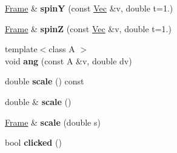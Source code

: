 \begin{DoxyCompactItemize}
\item 
\hypertarget{classvsr_1_1_frame_af899032928e02d32a79583195922c9c9}{\hyperlink{classvsr_1_1_frame}{Frame} \& {\bfseries spin\-Y} (const \hyperlink{namespacevsr_a0d061c30ac198a710a1b92dd8b343273}{Vec} \&v, double t=1.)}\label{classvsr_1_1_frame_af899032928e02d32a79583195922c9c9}

\item 
\hypertarget{classvsr_1_1_frame_a612a28303fe567b4dce7240eeace334b}{\hyperlink{classvsr_1_1_frame}{Frame} \& {\bfseries spin\-Z} (const \hyperlink{namespacevsr_a0d061c30ac198a710a1b92dd8b343273}{Vec} \&v, double t=1.)}\label{classvsr_1_1_frame_a612a28303fe567b4dce7240eeace334b}

\item 
\hypertarget{classvsr_1_1_frame_ac196bc3d06fc0fae2d169e4bf230665a}{{\footnotesize template$<$class A $>$ }\\void {\bfseries ang} (const A \&v, double dv)}\label{classvsr_1_1_frame_ac196bc3d06fc0fae2d169e4bf230665a}

\item 
\hypertarget{classvsr_1_1_frame_aed6f9a0b9155e846e30e09bc4bc63264}{double {\bfseries scale} () const }\label{classvsr_1_1_frame_aed6f9a0b9155e846e30e09bc4bc63264}

\item 
\hypertarget{classvsr_1_1_frame_a9392c857c574357016b7c8f9b61426b1}{double \& {\bfseries scale} ()}\label{classvsr_1_1_frame_a9392c857c574357016b7c8f9b61426b1}

\item 
\hypertarget{classvsr_1_1_frame_a5a8e53b52874243577efe36d6df16ad9}{\hyperlink{classvsr_1_1_frame}{Frame} \& {\bfseries scale} (double s)}\label{classvsr_1_1_frame_a5a8e53b52874243577efe36d6df16ad9}

\item 
\hypertarget{classvsr_1_1_frame_a4af76aff042148d0849e1fb9f89894a5}{bool {\bfseries clicked} ()}\label{classvsr_1_1_frame_a4af76aff042148d0849e1fb9f89894a5}

\end{DoxyCompactItemize}
